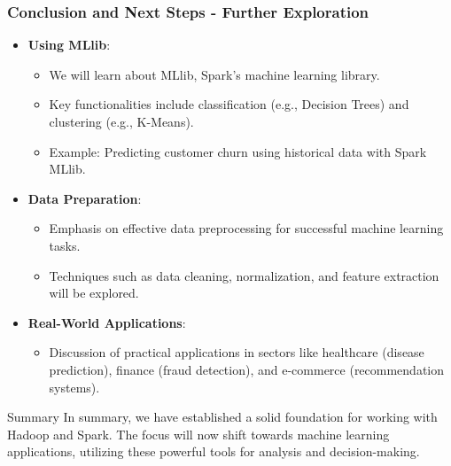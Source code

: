 \documentclass[aspectratio=169]{beamer}
\begin{document}
\begin{frame}[fragile]
    \frametitle{Conclusion and Next Steps - Further Exploration}
    \begin{itemize}
        \item \textbf{Using MLlib}:
        \begin{itemize}
            \item We will learn about MLlib, Spark's machine learning library.
            \item Key functionalities include classification (e.g., Decision Trees) and clustering (e.g., K-Means).
            \item Example: Predicting customer churn using historical data with Spark MLlib.
        \end{itemize}
        
        \item \textbf{Data Preparation}:
        \begin{itemize}
            \item Emphasis on effective data preprocessing for successful machine learning tasks.
            \item Techniques such as data cleaning, normalization, and feature extraction will be explored.
        \end{itemize}
        
        \item \textbf{Real-World Applications}:
        \begin{itemize}
            \item Discussion of practical applications in sectors like healthcare (disease prediction), finance (fraud detection), and e-commerce (recommendation systems).
        \end{itemize}
    \end{itemize}
    
    \begin{block}{Summary}
        In summary, we have established a solid foundation for working with Hadoop and Spark. The focus will now shift towards machine learning applications, utilizing these powerful tools for analysis and decision-making.
    \end{block}
\end{frame}
\end{document}
